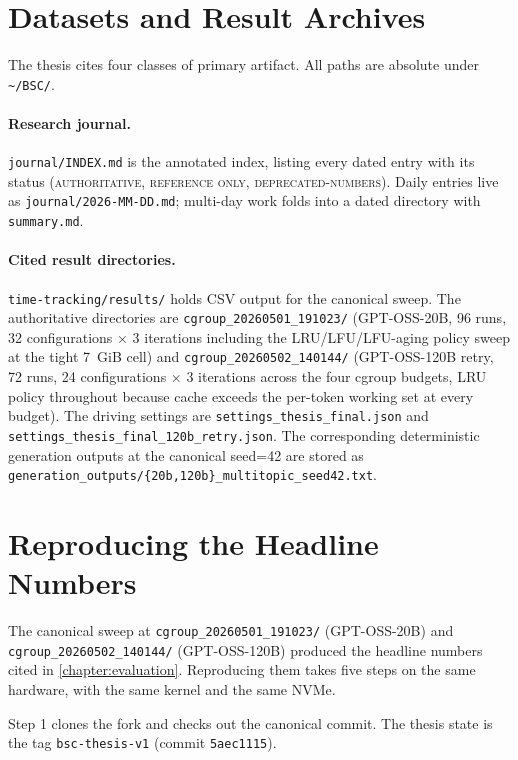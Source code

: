 \section{Datasets and Result Archives}\label{sec:art-datasets}

The thesis cites four classes of primary artifact. All paths are absolute under \texttt{\textasciitilde/BSC/}.

\paragraph{Research journal.} \texttt{journal/INDEX.md} is the annotated index, listing every dated entry with its status (\textsc{authoritative}, \textsc{reference only}, \textsc{deprecated-numbers}). Daily entries live as \texttt{journal/2026-MM-DD.md}; multi-day work folds into a dated directory with \texttt{summary.md}.

\paragraph{Cited result directories.} \texttt{time-tracking/results/} holds CSV output for the canonical sweep. The authoritative directories are \texttt{cgroup\_20260501\_191023/} (GPT-OSS-20B, 96 runs, 32 configurations $\times$ 3 iterations including the LRU/LFU/LFU-aging policy sweep at the tight 7~GiB cell) and \texttt{cgroup\_20260502\_140144/} (GPT-OSS-120B retry, 72 runs, 24 configurations $\times$ 3 iterations across the four cgroup budgets, LRU policy throughout because cache exceeds the per-token working set at every budget). The driving settings are \texttt{settings\_thesis\_final.json} and \texttt{settings\_thesis\_final\_120b\_retry.json}. The corresponding deterministic generation outputs at the canonical seed=42 are stored as \texttt{generation\_outputs/\{20b,120b\}\_multitopic\_seed42.txt}.


\section{Reproducing the Headline Numbers}\label{sec:art-reproducing}

The canonical sweep at \texttt{cgroup\_20260501\_191023/} (GPT-OSS-20B) and \texttt{cgroup\_20260502\_140144/} (GPT-OSS-120B) produced the headline numbers cited in \autoref{chapter:evaluation}. Reproducing them takes five steps on the same hardware, with the same kernel and the same NVMe.

Step 1 clones the fork and checks out the canonical commit. The thesis state is the tag \texttt{bsc-thesis-v1} (commit \texttt{5aec1115}).

